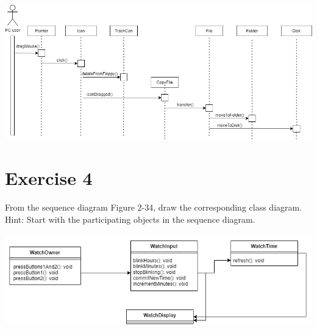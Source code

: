 \documentclass{article}
\begin{document}
\includegraphics[scale=0.5]{Untitled Diagram.png}


\section{Exercise 4}
From the sequence diagram Figure 2-34, draw the corresponding class diagram. Hint: Start with the participating objects in the sequence diagram.

 
\includegraphics[scale=0.8]{Untitled Diagram (1).png}
\end{document}
